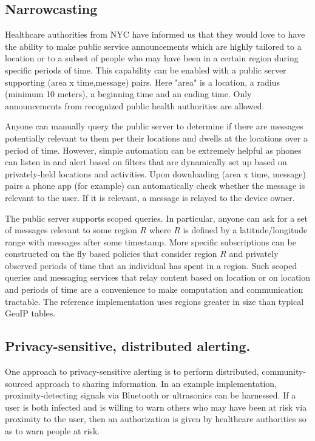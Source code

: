 \documentclass{article}
\begin{document}
\subsection{Narrowcasting}

Healthcare authorities from NYC have informed us that they would love to have the ability to make public service announcements which are highly tailored to a location or to a subset of people who may have been in a certain region during specific periods of time.  This capability can be enabled with a public server supporting (area x time,message) pairs.  Here "area" is a location, a radius (minimum 10 meters), a beginning time and an ending time.  Only announcements from recognized public health authorities are allowed.  

Anyone can manually query the public server to determine if there are messages potentially relevant to them per their locations and dwells at the locations over a period of time. However, simple automation can be extremely helpful as phones can listen in and alert based on filters that are dynamically set up based on privately-held locations and activities. Upon downloading (area x time, message) pairs a phone app (for example) can automatically check whether the message is relevant to the user.  If it is relevant, a message is relayed to the device owner.

The public server supports scoped queries.  In particular, anyone can ask for a set of messages relevant to some region $R$ where $R$ is defined by a latitude/longitude range with messages after some timestamp.  More specific subscriptions can be constructed on the fly based policies that consider region $R$ and privately observed periods of time that an individual has spent in a region. Such scoped queries and messaging services that relay content based on location or on location and periods of time are a convenience to make computation and communication tractable.  The reference implementation uses regions greater in size than typical GeoIP tables.

\subsection{Privacy-sensitive, distributed alerting.} 
One approach to privacy-sensitive alerting is to perform distributed, community-sourced approach to sharing information. In an example implementation, proximity-detecting signals via Bluetooth or ultrasonics can be harnessed.  If a user is both infected and is willing to warn others who may have been at risk via proximity to the user, then an authorization is given by healthcare authorities so as to warn people at risk.
\end{document}
